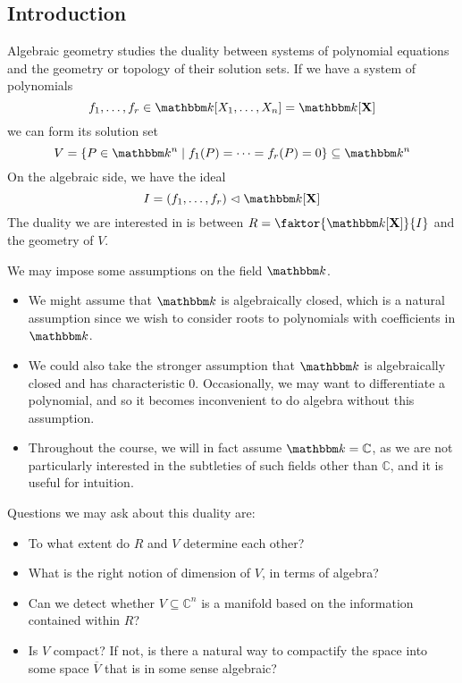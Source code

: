 \subsection{Introduction}
Algebraic geometry studies the duality between systems of polynomial equations and the geometry or topology of their solution sets.
If we have a system of polynomials
\[ f_1, \dots, f_r \in \mathbbm k[X_1, \dots, X_n] = \mathbbm k[\vb X] \]
we can form its solution set
\[ V = \qty{P \in \mathbbm k^n \mid f_1(P) = \dots = f_r(P) = 0} \subseteq \mathbbm k^n \]
On the algebraic side, we have the ideal
\[ I = (f_1, \dots, f_r) \vartriangleleft \mathbbm k[\vb X] \]
The duality we are interested in is between \( R = \faktor{\mathbbm k[\vb X]}{I} \) and the geometry of \( V \).

We may impose some assumptions on the field \( \mathbbm k \).
\begin{itemize}
    \item We might assume that \( \mathbbm k \) is algebraically closed, which is a natural assumption since we wish to consider roots to polynomials with coefficients in \( \mathbbm k \).
    \item We could also take the stronger assumption that \( \mathbbm k \) is algebraically closed and has characteristic 0.
    Occasionally, we may want to differentiate a polynomial, and so it becomes inconvenient to do algebra without this assumption.
    \item Throughout the course, we will in fact assume \( \mathbbm k = \mathbb C \), as we are not particularly interested in the subtleties of such fields other than \( \mathbb C \), and it is useful for intuition.
\end{itemize}
Questions we may ask about this duality are:
\begin{itemize}
    \item To what extent do \( R \) and \( V \) determine each other?
    \item What is the right notion of dimension of \( V \), in terms of algebra?
    \item Can we detect whether \( V \subseteq \mathbb C^n \) is a manifold based on the information contained within \( R \)?
    \item Is \( V \) compact?
    If not, is there a natural way to compactify the space into some space \( \overline V \) that is in some sense algebraic?
\end{itemize}


